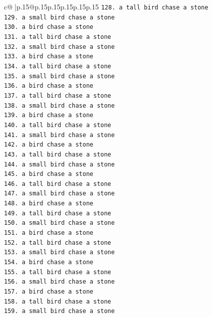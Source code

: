 \documentclass{article}
\begin{document}
{\begin{supertabular}{c@{$\;$}|p{.15\linewidth}@{}p{.15\linewidth}p{.15\linewidth}p{.15\linewidth}p{.15\linewidth}p{.15\linewidth}}
{{{\texttt{128. a tall bird chase a stone} \\
\texttt{129. a small bird chase a stone} \\
\texttt{130. a bird chase a stone} \\
\texttt{131. a tall bird chase a stone} \\
\texttt{132. a small bird chase a stone} \\
\texttt{133. a bird chase a stone} \\
\texttt{134. a tall bird chase a stone} \\
\texttt{135. a small bird chase a stone} \\
\texttt{136. a bird chase a stone} \\
\texttt{137. a tall bird chase a stone} \\
\texttt{138. a small bird chase a stone} \\
\texttt{139. a bird chase a stone} \\
\texttt{140. a tall bird chase a stone} \\
\texttt{141. a small bird chase a stone} \\
\texttt{142. a bird chase a stone} \\
\texttt{143. a tall bird chase a stone} \\
\texttt{144. a small bird chase a stone} \\
\texttt{145. a bird chase a stone} \\
\texttt{146. a tall bird chase a stone} \\
\texttt{147. a small bird chase a stone} \\
\texttt{148. a bird chase a stone} \\
\texttt{149. a tall bird chase a stone} \\
\texttt{150. a small bird chase a stone} \\
\texttt{151. a bird chase a stone} \\
\texttt{152. a tall bird chase a stone} \\
\texttt{153. a small bird chase a stone} \\
\texttt{154. a bird chase a stone} \\
\texttt{155. a tall bird chase a stone} \\
\texttt{156. a small bird chase a stone} \\
\texttt{157. a bird chase a stone} \\
\texttt{158. a tall bird chase a stone} \\
\texttt{159. a small bird chase a stone} \\
}}}
\end{supertabular}}
\end{document}
